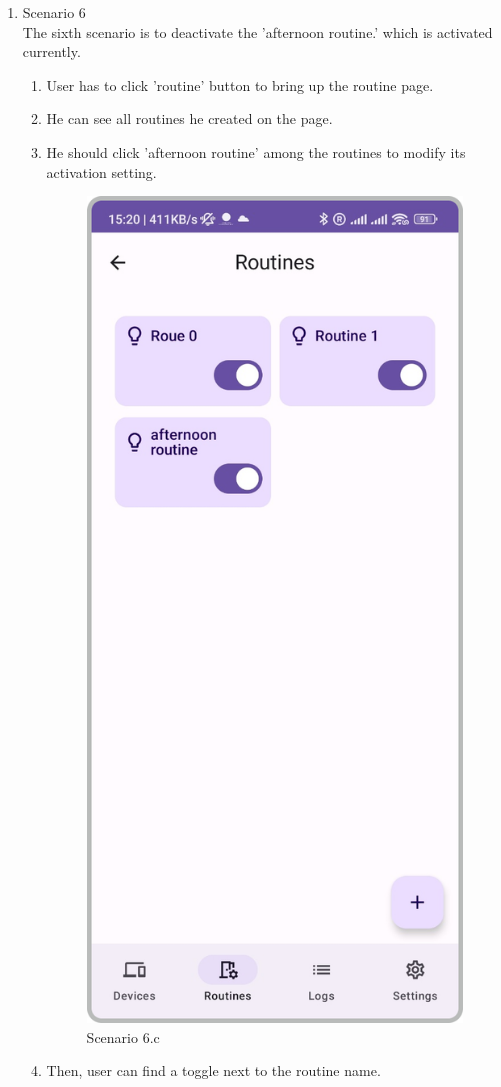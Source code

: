 \begin{enumerate}
    \item Scenario 6\\
          The sixth scenario is to deactivate the 'afternoon routine.' which is activated currently.\\
          \begin{enumerate}
              \item User has to click 'routine' button to bring up the routine page.\\
              \item He can see all routines he created on the page.\\
              \item He should click 'afternoon routine' among the routines to modify its activation setting.\\
                    \begin{figure}
                        \centering
                        \includegraphics[width=0.5\linewidth]{imgs/usercase/scenario6-a.png}
                        \caption{Scenario 6.c}
                        \label{fig:enter-label}
                    \end{figure}
              \item Then, user can find a toggle next to the routine name.\\

\end{enumerate}
\end{enumerate}

